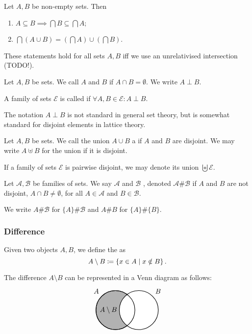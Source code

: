 \begin{proposition}
Let $A, B$ be non-empty sets. Then
\begin{enumerate}
\item $A \subseteq B \implies \bigcap B\subseteq \bigcap A$;
\item $\bigcap(A\cup B) = (\bigcap A)\cup (\bigcap B)$.
\end{enumerate}
These statements hold for all sets $A,B$ iff we use an unrelativised intersection (TODO!).
\end{proposition}

\begin{definition}
Let $A,B$ be sets. We call $A$ and $B$  if $A\cap B = \emptyset$. We write $A\perp B$.

A family of sets $\mathcal{E}$ is called  if $\forall A,B\in\mathcal{E}: A\perp B$.
\end{definition}
The notation $A\perp B$ is not standard in general set theory, but is somewhat standard for disjoint elements in lattice theory.

\begin{definition}
Let $A,B$ be sets. We call the union $A\cup B$ a  if $A$ and $B$ are disjoint. We may write $A\uplus B$ for the union if it is disjoint.

If a family of sets $\mathcal{E}$ is pairwise disjoint, we may denote its union $\biguplus \mathcal{E}$.
\end{definition}

\begin{definition}
Let $\mathcal{A},\mathcal{B}$ be families of sets. We say $\mathcal{A}$ and $\mathcal{B}$ , denoted $\mathcal{A} \# \mathcal{B}$ if $A$ and $B$ are not disjoint, $A\cap B \neq \emptyset$, for all $A\in \mathcal{A}$ and $B\in\mathcal{B}$.

We write $A \# \mathcal{B}$ for $\{A\}\# \mathcal{B}$ and $A\# B$ for $\{A\}\#\{B\}$.
\end{definition}

\subsubsection{Difference}
\begin{definition}
Given two objects $A,B$, we define the  as
\[A\setminus B \coloneqq \left\{ x\in A \;\middle|\; x\notin B \right\}. \]
\end{definition}
The difference $A\setminus B$ can be represented in a Venn diagram as follows:
\[ \begin{tikzpicture}[thick,
    set/.style = {circle,
        minimum size = 2cm}]

\node[set,draw,fill=black!30,label={135:$A$}] (A) at (0,0) {};

\node[set,draw,fill=white,label={45:$B$}] (B) at (1.2,0) {};

\draw (0,0) circle(1cm);

\node at (-0.36,0) {$A\setminus B$};
\end{tikzpicture} \]

